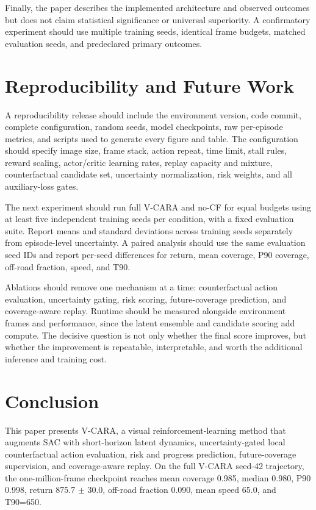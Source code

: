 \documentclass[11pt]{article}
\begin{document}
Finally, the paper describes the implemented architecture and observed
outcomes but does not claim statistical significance or universal
superiority. A confirmatory experiment should use multiple training
seeds, identical frame budgets, matched evaluation seeds, and
predeclared primary outcomes.

\section{Reproducibility and Future
Work}\label{reproducibility-and-future-work}

A reproducibility release should include the environment version, code
commit, complete configuration, random seeds, model checkpoints, raw
per-episode metrics, and scripts used to generate every figure and
table. The configuration should specify image size, frame stack, action
repeat, time limit, stall rules, reward scaling, actor/critic learning
rates, replay capacity and mixture, counterfactual candidate set,
uncertainty normalization, risk weights, and all auxiliary-loss gates.

The next experiment should run full V-CARA and no-CF for equal budgets
using at least five independent training seeds per condition, with a
fixed evaluation suite. Report means and standard deviations across
training seeds separately from episode-level uncertainty. A paired
analysis should use the same evaluation seed IDs and report per-seed
differences for return, mean coverage, P90 coverage, off-road fraction,
speed, and T90.

Ablations should remove one mechanism at a time: counterfactual action
evaluation, uncertainty gating, risk scoring, future-coverage
prediction, and coverage-aware replay. Runtime should be measured
alongside environment frames and performance, since the latent ensemble
and candidate scoring add compute. The decisive question is not only
whether the final score improves, but whether the improvement is
repeatable, interpretable, and worth the additional inference and
training cost.

\section{Conclusion}\label{conclusion}

This paper presents V-CARA, a visual reinforcement-learning method that
augments SAC with short-horizon latent dynamics, uncertainty-gated local
counterfactual action evaluation, risk and progress prediction,
future-coverage supervision, and coverage-aware replay. On the full
V-CARA seed-42 trajectory, the one-million-frame checkpoint reaches
mean coverage 0.985, median 0.980, P90 0.998, return 875.7 \(\pm\) 30.0,
off-road fraction 0.090, mean speed 65.0, and T90=650.
\end{document}
